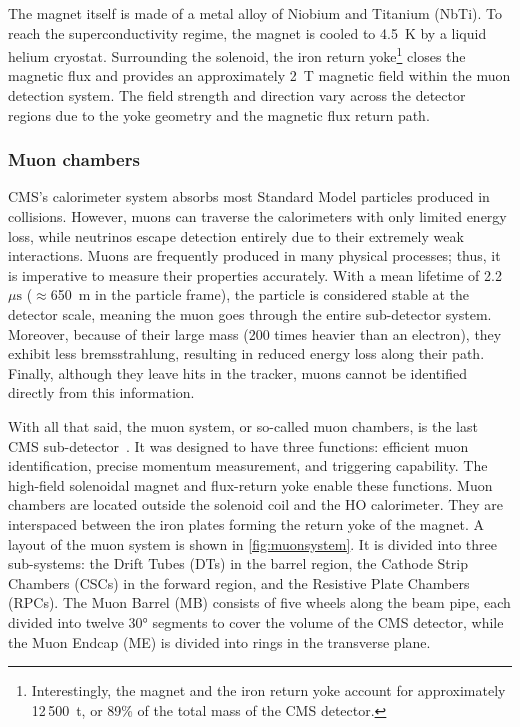 The magnet itself is made of a metal alloy of Niobium and Titanium (NbTi). To reach the superconductivity regime, the magnet is cooled to 4.5~K by a liquid helium cryostat. Surrounding the solenoid, the iron return yoke\footnote{Interestingly, the magnet and the iron return yoke account for approximately 12\,500~t, or 89\% of the total mass of the CMS detector.} closes the magnetic flux and provides an approximately 2~T magnetic field within the muon detection system. The field strength and direction vary across the detector regions due to the yoke geometry and the magnetic flux return path.


\subsubsection{Muon chambers}

CMS's calorimeter system absorbs most Standard Model particles produced in collisions. However, muons can traverse the calorimeters with only limited energy loss, while neutrinos escape detection entirely due to their extremely weak interactions. Muons are frequently produced in many physical processes; thus, it is imperative to measure their properties accurately. With a mean lifetime of 2.2~$\mu\textrm{s}$ ($\approx$650~m in the particle frame), the particle is considered stable at the detector scale, meaning the muon goes through the entire sub-detector system. Moreover, because of their large mass (200 times heavier than an electron), they exhibit less bremsstrahlung, resulting in reduced energy loss along their path. Finally, although they leave hits in the tracker, muons cannot be identified directly from this information.

\vspace{0.5 cm}

With all that said, the muon system, or so-called muon chambers, is the last CMS sub-detector~\cite{CMSmuonTDR, CMSRun3detector}. It was designed to have three functions: efficient muon identification, precise momentum measurement, and triggering capability. The high-field solenoidal magnet and flux-return yoke enable these functions. Muon chambers are located outside the solenoid coil and the HO calorimeter. They are interspaced between the iron plates forming the return yoke of the magnet. A layout of the muon system is shown in \cref{fig:muonsystem}. It is divided into three sub-systems: the Drift Tubes (DTs) in the barrel region, the Cathode Strip Chambers (CSCs) in the forward region, and the Resistive Plate Chambers (RPCs). The Muon Barrel (MB) consists of five wheels along the beam pipe, each divided into twelve 30° segments to cover the volume of the CMS detector, while the Muon Endcap (ME) is divided into rings in the transverse plane.

